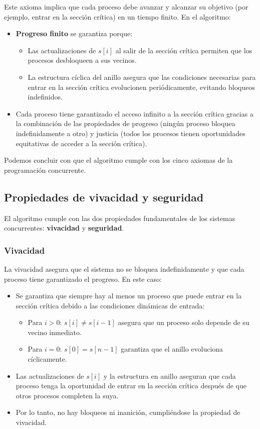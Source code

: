 \documentclass[a4paper,12pt]{article}
\begin{document}
Este axioma implica que cada proceso debe avanzar y alcanzar su objetivo (por ejemplo, entrar en la sección crítica) en un tiempo finito. En el algoritmo:

\begin{itemize}
    \item \textbf{Progreso finito} se garantiza porque:
    \begin{itemize}
        \item Las actualizaciones de \( s[i] \) al salir de la sección crítica permiten que los procesos desbloqueen a sus vecinos.
        \item La estructura cíclica del anillo asegura que las condiciones necesarias para entrar en la sección crítica evolucionen periódicamente, evitando bloqueos indefinidos.
    \end{itemize}
    \item Cada proceso tiene garantizado el acceso infinito a la sección crítica gracias a la combinación de las propiedades de progreso (ningún proceso bloquea indefinidamente a otro) y justicia (todos los procesos tienen oportunidades equitativas de acceder a la sección crítica).
\end{itemize}


Podemos concluir con que el algoritmo cumple con los cinco axiomas de la programación concurrente.

\subsection{Propiedades de vivacidad y seguridad}

El algoritmo cumple con las dos propiedades fundamentales de los sistemas concurrentes: \textbf{vivacidad} y \textbf{seguridad}.

\subsubsection{Vivacidad}

La vivacidad asegura que el sistema no se bloquea indefinidamente y que cada proceso tiene garantizado el progreso. En este caso:

\begin{itemize}
    \item Se garantiza que siempre hay al menos un proceso que puede entrar en la sección crítica debido a las condiciones dinámicas de entrada:
    \begin{itemize}
        \item Para \( i > 0 \): \( s[i] \neq s[i-1] \) asegura que un proceso solo depende de su vecino inmediato.
        \item Para \( i = 0 \): \( s[0] = s[n-1] \) garantiza que el anillo evoluciona cíclicamente.
    \end{itemize}
    \item Las actualizaciones de \( s[i] \) y la estructura en anillo aseguran que cada proceso tenga la oportunidad de entrar en la sección crítica después de que otros procesos completen la suya.
    \item Por lo tanto, no hay bloqueos ni inanición, cumpliéndose la propiedad de vivacidad.
\end{itemize}
\end{document}
